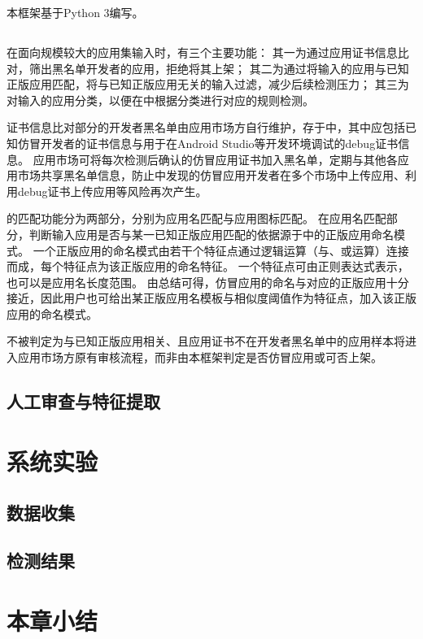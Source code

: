 本框架基于Python 3编写。

\subsection{\componentA }
在面向规模较大的应用集输入时，\componentA 有三个主要功能：
其一为通过应用证书信息比对，筛出黑名单开发者的应用，拒绝将其上架；
其二为通过将输入的应用与已知正版应用匹配，将与已知正版应用无关的输入过滤，减少后续检测压力；
其三为对输入的应用分类，以便在\componentC 中根据分类进行对应的规则检测。

证书信息比对部分的开发者黑名单由应用市场方自行维护，存于\componentD 中，其中应包括已知仿冒开发者的证书信息与用于在Android Studio等开发环境调试的debug证书信息。
应用市场可将每次检测后确认的仿冒应用证书加入黑名单，定期与其他各应用市场共享黑名单信息，防止中发现的仿冒应用开发者在多个市场中上传应用、利用debug证书上传应用等风险再次产生。

\componentA 的匹配功能分为两部分，分别为应用名匹配与应用图标匹配。
在应用名匹配部分，判断输入应用是否与某一已知正版应用匹配的依据源于\componentD 中的正版应用命名模式。
一个正版应用的命名模式由若干个特征点通过逻辑运算（与、或运算）连接而成，每个特征点为该正版应用的命名特征。
一个特征点可由正则表达式表示，也可以是应用名长度范围。
由总结可得，仿冒应用的命名与对应的正版应用十分接近，因此用户也可给出某正版应用名模板与相似度阈值作为特征点，加入该正版应用的命名模式。

不被\componentA 判定为与已知正版应用相关、且应用证书不在开发者黑名单中的应用样本将进入应用市场方原有审核流程，而非由本框架判定是否仿冒应用或可否上架。

\subsection{\componentB }
\subsection{\componentC }
\subsection{人工审查与特征提取}
\section{系统实验}
\subsection{数据收集}
\subsection{检测结果}
\section{本章小结}
